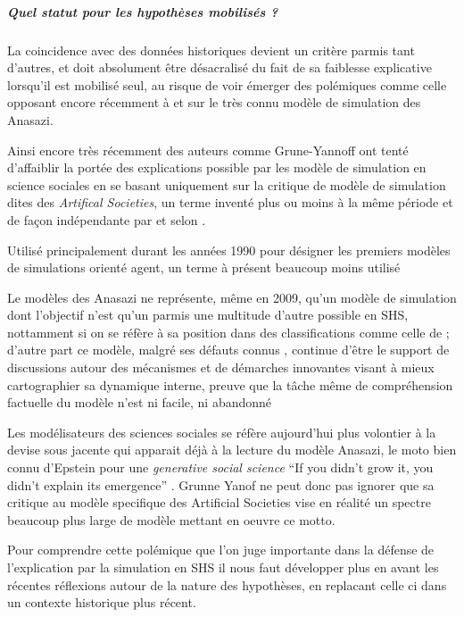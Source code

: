 \subparagraph{Quel statut pour les hypothèses mobilisés ? } 

La coincidence avec des données historiques devient un critère parmis tant d'autres, et doit absolument être désacralisé du fait de sa faiblesse explicative lorsqu'il est mobilisé seul, au risque de voir émerger des polémiques comme celle opposant encore récemment \textcite{Yannoff2009} à \textcite{Chattoe2011} et \textcite{Elsenbroich2012} sur le très connu modèle de simulation des Anasazi.

Ainsi encore très récemment des auteurs comme Grune-Yannoff \autocite{Yannoff2009} ont tenté d'affaiblir la portée des explications possible par les modèle de simulation en science sociales en se basant uniquement sur la critique de modèle de simulation dites des \textit{Artifical Societies}, un terme inventé plus ou moins à la même période et de façon indépendante  par \textcite{Epstein1996}  et \textcite{Gilbert1995a} selon \textcite{Gilbert2000}. 

Utilisé principalement durant les années 1990 pour désigner les premiers modèles de  simulations orienté agent, un terme à présent beaucoup moins utilisé \autocite{Chattoe2011}

Le modèles des Anasazi \autocites{Dean2000, Epstein2002} ne représente, même en 2009, qu'un modèle de simulation dont l'objectif n'est qu'un parmis une multitude d'autre possible en SHS, nottamment si on se réfère à sa position \autocite{Schmitt2013} dans des classifications comme celle de \autocites{Banos2012, Banos2013}; d'autre part ce modèle, malgré ses défauts connus \autocites{Janssen2009, Schmitt2013}, continue d'être le support de discussions autour des mécanismes et de démarches innovantes visant à mieux cartographier sa dynamique interne, preuve que la tâche même de compréhension factuelle du modèle n'est ni facile, ni abandonné \autocites{Stonedahl2010, Janssen2009}

Les modélisateurs des sciences sociales se réfère aujourd'hui plus volontier à la devise sous jacente qui apparait déjà à la lecture du modèle Anasazi, le moto bien connu d'Epstein pour une \textit{generative social science} \foreignquote{english}{If you didn't grow it, you didn't explain its emergence} \autocite{Epstein2006}. Grunne Yanof ne peut donc pas ignorer que sa critique au modèle specifique des Artificial Societies vise en réalité un spectre beaucoup plus large de modèle mettant en oeuvre ce motto.

Pour comprendre cette polémique que l'on juge importante dans la défense de l'explication par la simulation en SHS il nous faut développer plus en avant les récentes réflexions autour de la nature des hypothèses, en replacant celle ci dans un contexte historique plus récent. 



